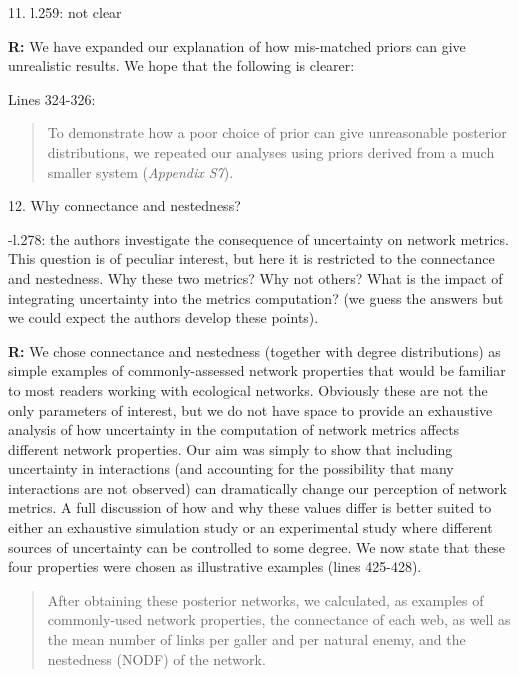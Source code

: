 \documentclass[12pt]{letter}
\newenvironment{refquote}{\bigskip \begin{it}}{\end{it}\smallskip}
\begin{document}
	11. l.259: not clear 
	
		
		\textbf{R:} We have expanded our explanation of how mis-matched priors can give unrealistic results. We hope that the following is clearer:


		Lines 324-326:


		\begin{quotation}
			To demonstrate how a poor choice of prior can give unreasonable posterior distributions, we repeated our analyses using priors derived from a much smaller system (\emph{Appendix S7}).
		\end{quotation}


	12. Why connectance and nestedness?


		\begin{refquote}
			-l.278: the authors investigate the consequence of uncertainty on network metrics. This question is of peculiar interest, but here it is restricted to the connectance and nestedness. Why these two metrics? Why not others? What is the impact of integrating uncertainty into the metrics computation? (we guess the answers but we could expect the authors develop these points).
		\end{refquote}


		\textbf{R:} We chose connectance and nestedness (together with degree distributions) as simple examples of commonly-assessed network properties that would be familiar to most readers working with ecological networks. Obviously these are not the only parameters of interest, but we do not have space to provide an exhaustive analysis of how uncertainty in the computation of network metrics affects different network properties. Our aim was simply to show that including uncertainty in interactions (and accounting for the possibility that many interactions are not observed) can dramatically change our perception of network metrics. A full discussion of how and why these values differ is better suited to either an exhaustive simulation study or an experimental study where different sources of uncertainty can be controlled to some degree. We now state that these four properties were chosen as illustrative examples (lines 425-428).


		\begin{quotation}
			After obtaining these posterior networks, we calculated, as examples of commonly-used network properties, the connectance of each web, as well as the mean number of links per galler and per natural enemy, and the nestedness (NODF) of the network.
		\end{quotation}
\end{document}
